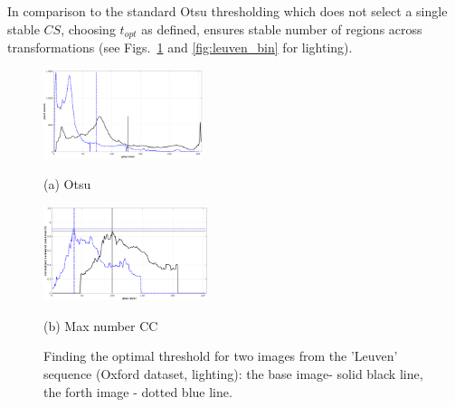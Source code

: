 \documentclass[conference,compsoc]{IEEEtran}
\begin{document}
In comparison to the standard Otsu thresholding which does not select a single stable $CS$, choosing $t_{opt}$ as defined, ensures stable number of regions across transformations (see Figs.~\ref{fig:binary_hist} and \ref{fig:leuven_bin} for lighting).
\vspace{-0.8cm}
\begin{figure}[htb]

\begin{minipage}[b]{0.49\linewidth}
  \centering
  \centerline{\includegraphics[width=4.65cm]{hist_otsu_leuven_1_4}}
  \centerline{(a) Otsu}\medskip
\end{minipage}
\hfill
\begin{minipage}[b]{0.49\linewidth}
  \centering
  \centerline{\includegraphics[width=4.8cm]{hist_numcc_leuven_1_4}}
\centerline{(b) Max number CC}\medskip
\end{minipage}
\hfill
\vspace{-0.5cm}
\caption{Finding the optimal threshold for two images from the 'Leuven' sequence 
(Oxford dataset, lighting): the base image- solid black line, the forth image - dotted blue line.}
\label{fig:binary_hist}
%
\end{figure}
\end{document}
